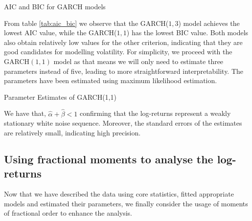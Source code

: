 \begin{table}[H]
    \centering

\caption{AIC and BIC for GARCH models} 
\label{tab:aic_bic}
\end{table}

From table \ref{tab:aic_bic} we observe that the GARCH(\(1, 3\)) model achieves the lowest AIC value, while the GARCH(\(1, 1\)) has the lowest BIC value. Both models also obtain relatively low values for the other criterion, indicating that they are good candidates for modelling volatility. For simplicity, we proceed with the GARCH\((1, 1)\) model as that means we will only need to estimate three parameters instead of five, leading to more straightforward interpretability. The parameters have been estimated using maximum likelihood estimation. 

\begin{table}[H]
    \centering

\caption{Parameter Estimates of GARCH(1,1)} 
\label{tab:parameter_estimates}
\end{table}

We have that, \(\hat{\alpha} + \hat{\beta} < 1\) confirming that the log-returns represent a weakly stationary white noise sequence. Moreover, the standard errors of the estimates are relatively small, indicating high precision.


\subsection{Using fractional moments to analyse the log-returns}
Now that we have described the data using core statistics, fitted appropriate models and estimated their parameters, we finally consider the usage of moments of fractional order to enhance the analysis.
